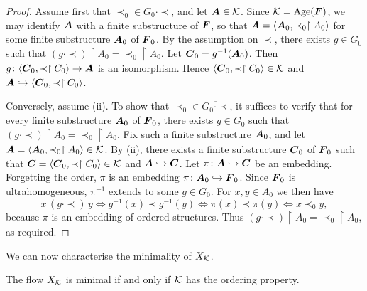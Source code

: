 \begin{proof}
    Assume first that
    \(\prec_0\in\overline{G_0\cdot \prec}\), and let \(\boldsymbol{A}\in\mathcal{K}\).
    Since \(\mathcal{K}=\operatorname{Age}(\boldsymbol{F})\), we may identify \(\boldsymbol{A}\) with a finite substructure of \(\boldsymbol{F}\), so that
    \(\boldsymbol{A}=\langle \boldsymbol{A}_0,\prec_0\restriction A_0\rangle\)
    for some finite substructure \(\boldsymbol{A}_0\) of \(\boldsymbol{F}_0\). By the assumption on \(\prec\), there exists
    \(g\in G_0\) such that
    \((g\cdot \prec)\restriction A_0=\prec_0\restriction A_0\). Let
    \(\boldsymbol{C}_0=g^{-1}(\boldsymbol{A}_0)\).
    Then
    \(g\colon \langle \boldsymbol{C}_0,\prec\restriction C_0\rangle\to \boldsymbol{A}\)
    is an isomorphism. Hence
    \(\langle \boldsymbol{C}_0,\prec\restriction C_0\rangle\in\mathcal{K}\) and
    \(\boldsymbol{A}\hookrightarrow \langle \boldsymbol{C}_0,\prec\restriction C_0\rangle\).

    Conversely, assume (ii). To show that
    \(\prec_0\in\overline{G_0\cdot \prec}\),
    it suffices to verify that for every finite substructure \(\boldsymbol{A}_0\) of \(\boldsymbol{F}_0\), there exists
    \(g\in G_0\) such that
    \((g\cdot \prec)\restriction A_0=\prec_0\restriction A_0\).
    Fix such a finite substructure \(\boldsymbol{A}_0\), and let
    \(\boldsymbol{A}=\langle \boldsymbol{A}_0,\prec_0\restriction A_0\rangle\in\mathcal{K}\).
    By (ii), there exists a finite substructure \(\boldsymbol{C}_0\) of \(\boldsymbol{F}_0\) such that
    \(\boldsymbol{C}=\langle \boldsymbol{C}_0,\prec\restriction C_0\rangle\in\mathcal{K}\) and
    \(\boldsymbol{A}\hookrightarrow \boldsymbol{C}\).
    Let \(\pi\colon \boldsymbol{A}\hookrightarrow \boldsymbol{C}\) be an embedding. Forgetting the order,
    \(\pi\) is an embedding \(\pi\colon \boldsymbol{A}_0\hookrightarrow \boldsymbol{F}_0\).
    Since \(\boldsymbol{F}_0\) is ultrahomogeneous, \(\pi^{-1}\) extends to some
    \(g\in G_0\).
    For \(x,y\in A_0\) we then have
    \[
        x\,(g\cdot \prec)\,y
        \iff
        g^{-1}(x)\prec g^{-1}(y)
        \iff
        \pi(x)\prec \pi(y)
        \iff
        x\prec_0 y,
    \]
    because \(\pi\) is an embedding of ordered structures. Thus
    \((g\cdot \prec)\restriction A_0=\prec_0\restriction A_0\), as required.
\end{proof}
We can now characterise the minimality of \(X_{\mathcal{K}}\).

\begin{theorem}
    \label{thm:minimality-ordering-property}
    The flow \(X_{\mathcal{K}}\) is minimal if and only if \(\mathcal{K}\) has the ordering property.
\end{theorem}

